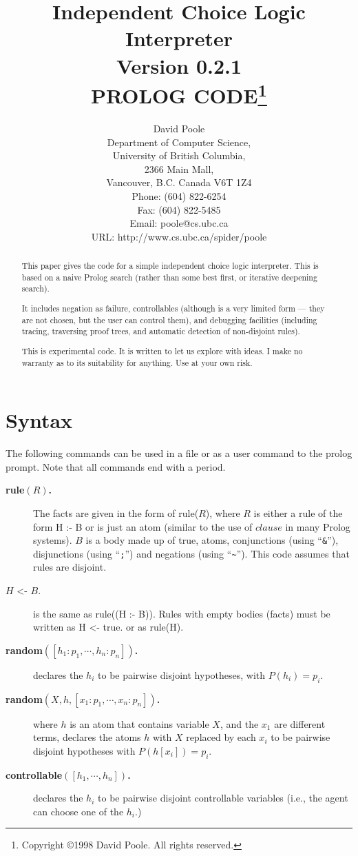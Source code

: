 \documentclass[11pt,fleqn]{article}
\title{Independent Choice Logic Interpreter\\Version 0.2.1
\\PROLOG CODE\thanks{Copyright \copyright 1998 David Poole. All rights
reserved.}}
\author{David Poole\\
Department of Computer Science,\\
University of British Columbia,\\
2366 Main Mall,\\
Vancouver, B.C. Canada V6T 1Z4\\
Phone: (604) 822-6254\\
Fax: (604) 822-5485\\
Email: {\ttfamily poole@cs.ubc.ca}\\
URL: {\ttfamily http://www.cs.ubc.ca/spider/poole}}
\newcommand{\btt}{\ttfamily\bfseries}
\begin{document}
\maketitle
\begin{abstract}
This paper gives the code for a simple independent choice logic
\cite{Poole97b,Poole98a} interpreter. This is based on a naive Prolog
search (rather than some best first, or iterative deepening search).

It includes negation as failure,
controllables (although is a very limited form --- they are
not chosen, but the user can control them), and debugging facilities
(including tracing, traversing proof trees, and automatic detection
of non-disjoint rules).

This is experimental code. It is written to let us explore with
ideas. I make no warranty as to its suitability for anything. Use at
your own risk.
\end{abstract}
\newpage
\section{Syntax} \label{vocabulary}
The following commands can be used in a file or
as a user command to the prolog prompt. Note that all commands end with a period.
\begin{description}
\item[{\btt rule$(R)$.}]
The facts are
given in the form of {\ttfamily rule($R$)}, where $R$ is either a rule of
the form {\ttfamily H :- B} or is just an atom (similar to the use of
$clause$ in many Prolog systems). $B$ is a body made up of {\ttfamily
true}, atoms, conjunctions (using ``\verb|&|''), disjunctions (using
``\verb|;|'') and negations (using ``\verb|~|''). This code assumes
that rules are disjoint. 
\item[{\ttfamily $H$ <- $B$.}] is the same as {\ttfamily rule((H :-
B))}. Rules with empty 
bodies (facts) must be written as {\ttfamily H <- true.} or as
{\ttfamily rule(H).} 
\item[{\btt random$([h_1:p_1,\cdots,h_n:p_n])$.}]declares
the $h_i$ to be pairwise disjoint hypotheses, with $P(h_i)=p_i$. 
\item[{\btt random$(X,h,[x_1:p_1,\cdots,x_n:p_n])$.}]
where $h$ is an atom that contains variable $X$, and the $x_1$ are
different terms, declares the atoms $h$ with $X$ replaced by each
$x_i$ to be pairwise disjoint hypotheses with $P(h[x_i])=p_i$.
\item[{\btt controllable$([h_1,\cdots,h_n])$.}]declares
the $h_i$ to be pairwise disjoint controllable variables (i.e., the
agent can choose one of the $h_i$.)
\end{description}
\end{document}
